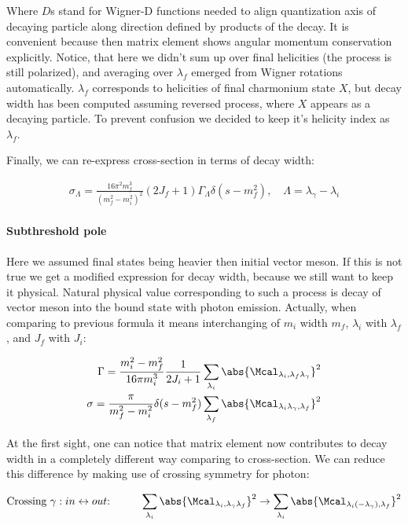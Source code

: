 Where $D$s stand for Wigner-D functions needed to align quantization axis of decaying particle along direction defined by products of the decay. It is convenient because then matrix element shows angular momentum conservation explicitly. Notice, that here we didn't sum up over final helicities (the process is still polarized), and averaging over $\lambda_f$ emerged from Wigner rotations automatically. $\lambda_f$ corresponds to helicities of final charmonium state $X$, but decay width has been computed assuming reversed process, where $X$ appears as a decaying particle. To prevent confusion we decided to keep it's helicity index as $\lambda_f$.

Finally, we can re-express cross-section in terms of decay width:

\begin{align} \label{eq:app:crsc-dw}
    \sigma_{\Lambda} = \frac{16 \pi^2 m_f^3}{(m_f^2 - m_i^2)^2} (2J_f + 1) \Gamma_{\Lambda} \delta(s - m_f^2),\quad \Lambda = \lambda_\gamma - \lambda_i
\end{align}

\paragraph{Subthreshold pole} Here we assumed final states being heavier then initial vector meson. If this is not true we get a modified expression for decay width, because we still want to keep it physical. Natural physical value corresponding to such a process is decay of vector meson into the bound state with photon emission. Actually, when comparing to previous formula it means interchanging of $m_i$ width $m_f$, $\lambda_i$ with $\lambda_f$, and $J_f$ with $J_i$:

\begin{align}
        \Gamma = \frac{m_i^2 - m_f^2}{16 \pi m_i^3} \frac{1}{2J_i + 1} \sum_{\lambda_i} \abs{\Mcal_{\lambda_i, \lambda_f \lambda_\gamma}}^2 \\
        \sigma = \frac{\pi}{m_f^2 - m_i^2} \delta(s - m_f^2) \sum_{\lambda_f} \abs{\Mcal_{\lambda_i \lambda_\gamma, \lambda_f}}^2
\end{align}

At the first sight, one can notice that matrix element now contributes to decay width in a completely different way comparing to cross-section. We can reduce this difference by making use of crossing symmetry for photon:

\begin{align}
    &\text{Crossing $\gamma: in \leftrightarrow out$:}\qquad &\sum_{\lambda_i} \abs{\Mcal_{\lambda_i, \lambda_\gamma \lambda_f}}^2 \rightarrow \sum_{\lambda_i} \abs{\Mcal_{\lambda_i (-\lambda_\gamma), \lambda_f}}^2 \\
\end{align}

